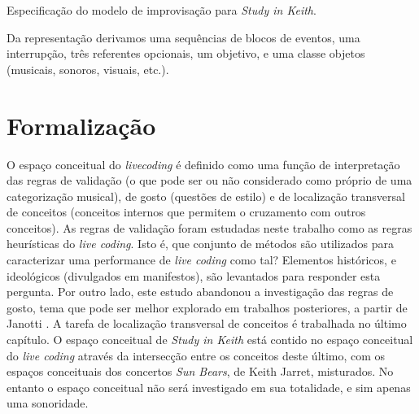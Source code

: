 \begin{example}{Especificação do modelo de improvisação para \emph{Study in Keith}.}

Da representação derivamos uma sequências de blocos de eventos, uma interrupção, três referentes opcionais, um objetivo, e uma classe objetos (musicais, sonoros, visuais, etc.).

\end{example}


\section{Formalização}\label{sec:formaliza}

O espaço conceitual do \emph{livecoding} é definido como uma função de interpretação das regras de validação (o que pode ser ou não considerado como próprio de uma categorização musical), de gosto (questões de estilo) e de localização transversal de conceitos (conceitos internos que permitem o cruzamento com outros conceitos). As regras de validação foram estudadas neste trabalho como as regras heurísticas do \emph{live coding}. Isto é, que conjunto de métodos são utilizados para caracterizar uma performance de \emph{live coding} como tal? Elementos históricos, e ideológicos (divulgados em manifestos), são levantados para responder esta pergunta. Por outro lado, este estudo abandonou a investigação das regras de gosto, tema que pode ser melhor explorado em trabalhos posteriores, a partir de Janotti . A tarefa de localização transversal de conceitos é trabalhada no último capítulo. O espaço conceitual de \emph{Study in Keith} está contido no espaço conceitual do \emph{live coding} através da intersecção entre os conceitos deste último, com os espaços conceituais dos concertos \emph{Sun Bears}, de Keith Jarret, misturados. No entanto o espaço conceitual não será investigado em sua totalidade, e sim apenas uma sonoridade.